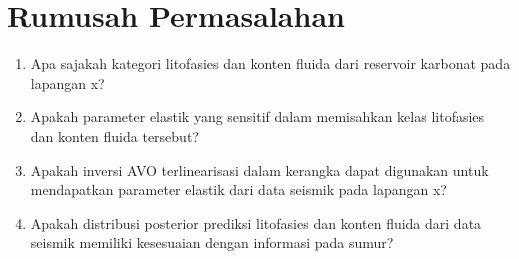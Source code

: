 \documentclass[main.tex]{subfiles}
\begin{document}
\section{Rumusah Permasalahan}
\begin{enumerate}[itemsep = 0pt, parsep = 0pt]
    \item Apa sajakah kategori litofasies dan konten fluida dari reservoir karbonat pada
    lapangan x?
    \item Apakah parameter elastik yang sensitif dalam memisahkan kelas litofasies
    dan konten fluida tersebut?
    \item Apakah inversi AVO terlinearisasi dalam kerangka dapat digunakan untuk
    mendapatkan parameter elastik dari data seismik pada lapangan x?
    \item Apakah distribusi posterior prediksi litofasies dan konten fluida dari data
    seismik memiliki kesesuaian dengan informasi pada sumur?
\end{enumerate}        
\end{document}
